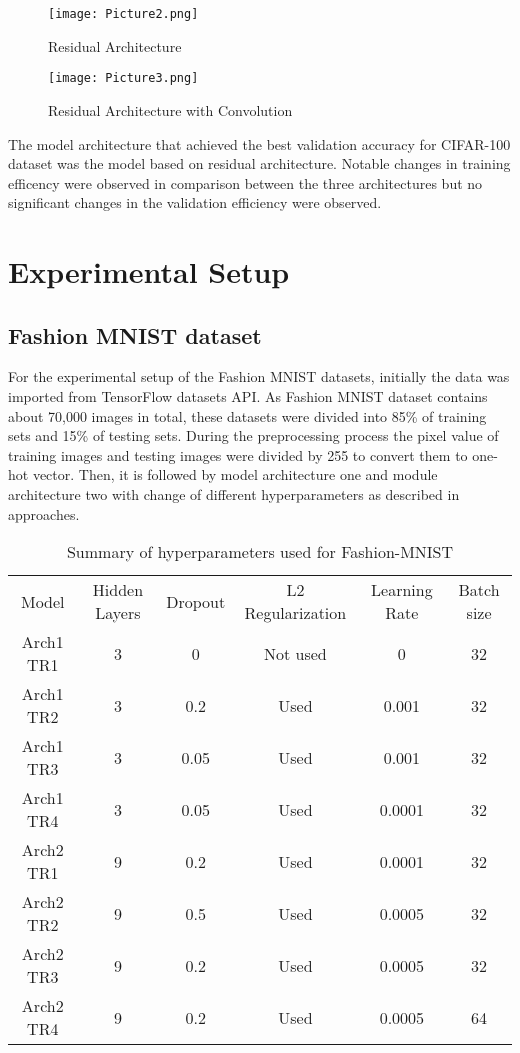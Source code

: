\documentclass{article}
\begin{document}
\begin{figure}[H]
    \centering
    \texttt{[image: Picture2.png]}
    \caption{Residual Architecture}
    \label{fig:ResidualB}
\end{figure}

\begin{figure}[H]
    \centering
    \texttt{[image: Picture3.png]}
    \caption{Residual Architecture with Convolution}
    \label{fig:ResidualBConv}
\end{figure}


The model architecture that achieved the best validation accuracy for CIFAR-100 dataset was the model based on residual architecture. Notable changes in training efficency were observed in comparison between the three architectures but no significant changes in the validation efficiency were observed.

\section{Experimental Setup}
\subsection{Fashion MNIST dataset}

For the experimental setup of the Fashion MNIST datasets, initially the data was imported from TensorFlow datasets API. As Fashion MNIST dataset contains about 70,000 images in total, these datasets were divided into 85\% of training sets and 15\% of testing sets. During the preprocessing process the pixel value of training images and testing images were divided by 255 to convert them to one-hot vector. Then, it is followed by model architecture one and module architecture two with change of different hyperparameters as described in approaches.

\begin{table}[h]
 \caption{Summary of hyperparameters used for Fashion-MNIST}
    \begin{tabular}{|c|c|c|c|c|c|} \hline
      Model   & Hidden Layers & Dropout & L2 Regularization & Learning Rate & Batch size\\
    Arch1 TR1 & 3 & 0 & Not used & 0 & 32\\
    Arch1 TR2 & 3 & 0.2 & Used & 0.001 & 32\\
    Arch1 TR3 & 3 & 0.05 & Used & 0.001 & 32\\ 
    Arch1 TR4 & 3 & 0.05 & Used & 0.0001 & 32\\
    Arch2 TR1 & 9 & 0.2 & Used & 0.0001 & 32\\
    Arch2 TR2 & 9 & 0.5 & Used & 0.0005 & 32\\
    Arch2 TR3 & 9 & 0.2 & Used & 0.0005 & 32\\
    Arch2 TR4 & 9 & 0.2 & Used & 0.0005 & 64\\\hline
    \end{tabular}
 
    \label{tab:CNN-perf}
\end{table}
\end{document}
